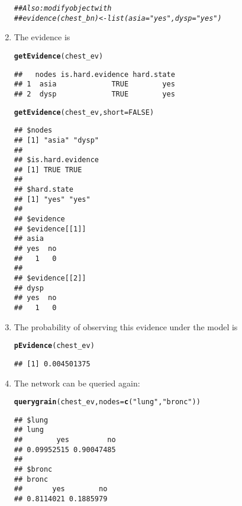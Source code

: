 \documentclass[10pt]{article}\usepackage[]{graphicx}\usepackage[]{xcolor}
\makeatletter
\newcommand{\hlnum}[1]{\textcolor[rgb]{0.686,0.059,0.569}{#1}}%
\newcommand{\hlstr}[1]{\textcolor[rgb]{0.192,0.494,0.8}{#1}}%
\newcommand{\hlcom}[1]{\textcolor[rgb]{0.678,0.584,0.686}{\textit{#1}}}%
\newcommand{\hlstd}[1]{\textcolor[rgb]{0.345,0.345,0.345}{#1}}%
\newcommand{\hlkwc}[1]{\textcolor[rgb]{0.333,0.667,0.333}{#1}}%
\newcommand{\hlkwd}[1]{\textcolor[rgb]{0.737,0.353,0.396}{\textbf{#1}}}%
\newenvironment{kframe}{%
 \def\at@end@of@kframe{}%
 \ifinner\ifhmode%
  \def\at@end@of@kframe{\end{minipage}}%
  \begin{minipage}{\columnwidth}%
 \fi\fi%
 \def\FrameCommand##1{\hskip\@totalleftmargin \hskip-\fboxsep
 \colorbox{shadecolor}{##1}\hskip-\fboxsep
     \hskip-\linewidth \hskip-\@totalleftmargin \hskip\columnwidth}%
 \MakeFramed {\advance\hsize-\width
   \@totalleftmargin\z@ \linewidth\hsize
   \@setminipage}}%
 {\par\unskip\endMakeFramed%
 \at@end@of@kframe}
\newenvironment{knitrout}{}{} %
\makeatother
\begin{document}
\begin{enumerate}
\begin{knitrout}
\begin{kframe}
\begin{alltt}
\hlcom{## Also: modify object with}
\hlcom{## evidence(chest_bn) <- list(asia="yes", dysp="yes")}
\end{alltt}
\end{kframe}
\end{knitrout}

\item The evidence is

\begin{knitrout}
\color{fgcolor}\begin{kframe}
\begin{alltt}
\hlkwd{getEvidence}\hlstd{(chest_ev)}
\end{alltt}
\begin{verbatim}
##   nodes is.hard.evidence hard.state
## 1  asia             TRUE        yes
## 2  dysp             TRUE        yes
\end{verbatim}
\begin{alltt}
\hlkwd{getEvidence}\hlstd{(chest_ev,} \hlkwc{short}\hlstd{=}\hlnum{FALSE}\hlstd{)}
\end{alltt}
\begin{verbatim}
## $nodes
## [1] "asia" "dysp"
## 
## $is.hard.evidence
## [1] TRUE TRUE
## 
## $hard.state
## [1] "yes" "yes"
## 
## $evidence
## $evidence[[1]]
## asia
## yes  no 
##   1   0 
## 
## $evidence[[2]]
## dysp
## yes  no 
##   1   0
\end{verbatim}
\end{kframe}
\end{knitrout}

\item The probability of observing this evidence under the model is
\begin{knitrout}
\color{fgcolor}\begin{kframe}
\begin{alltt}
\hlkwd{pEvidence}\hlstd{(chest_ev)}
\end{alltt}
\begin{verbatim}
## [1] 0.004501375
\end{verbatim}
\end{kframe}
\end{knitrout}

\item The network can be queried again:
\begin{knitrout}
\color{fgcolor}\begin{kframe}
\begin{alltt}
\hlkwd{querygrain}\hlstd{(chest_ev,} \hlkwc{nodes}\hlstd{=}\hlkwd{c}\hlstd{(}\hlstr{"lung"}\hlstd{,} \hlstr{"bronc"}\hlstd{))}
\end{alltt}
\begin{verbatim}
## $lung
## lung
##        yes         no 
## 0.09952515 0.90047485 
## 
## $bronc
## bronc
##       yes        no 
## 0.8114021 0.1885979
\end{verbatim}
\end{kframe}
\end{knitrout}

\end{enumerate}
\end{document}
